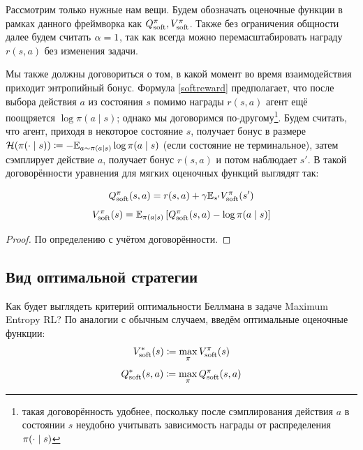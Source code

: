 Рассмотрим только нужные нам вещи. Будем обозначать оценочные функции в рамках данного фреймворка как $Q^\pi_{\mathrm{soft}}, V^\pi_{\mathrm{soft}}$. Также без ограничения общности далее будем считать $\alpha \HM= 1$, так как всегда можно перемасштабировать награду $r(s, a)$ без изменения задачи.

Мы также должны договориться о том, в какой момент во время взаимодействия приходит энтропийный бонус. Формула \eqref{softreward} предполагает, что после выбора действия $a$ из состояния $s$ помимо награды $r(s, a)$ агент ещё поощряется $\log \pi(a \mid s)$; однако мы договоримся по-другому\footnote{такая договорённость удобнее, поскольку после сэмплирования действия $a$ в состоянии $s$ неудобно учитывать зависимость награды от распределения $\pi(\cdot \HM\mid s)$}. Будем считать, что агент, приходя в некоторое состояние $s$, получает бонус в размере $\mathcal{H}(\pi(\cdot \mid s)) \HM\coloneqq - \E_{a \sim \pi(a \mid s)} \log \pi(a \mid s)$ (если состояние не терминальное), затем сэмплирует действие $a$, получает бонус $r(s, a)$ и потом наблюдает $s'$. В такой договорённости уравнения для мягких оценочных функций выглядят так:

\begin{theorem}
$$Q^\pi_{\mathrm{soft}}(s, a) = r(s, a) + \gamma \mathbb{E}_{s'} V^\pi_{\mathrm{soft}}(s')$$
\begin{equation}\label{softVQ}
V^\pi_{\mathrm{soft}}(s) = \mathbb{E}_{\pi(a \mid s)} \left[ Q^\pi_{\mathrm{soft}}(s, a) - \log \pi(a \mid s) \right]
\end{equation}
\begin{proof}
По определению с учётом договорённости.
\end{proof}
\end{theorem}

\subsection{Вид оптимальной стратегии}

Как будет выглядеть критерий оптимальности Беллмана в задаче Maximum Entropy RL? По аналогии с обычным случаем, введём оптимальные оценочные функции:
$$V^*_{\mathrm{soft}}(s) \coloneqq \max_{\pi} V^{\pi}_{\mathrm{soft}}(s)$$
$$Q^*_{\mathrm{soft}}(s, a) \coloneqq \max_{\pi} Q^{\pi}_{\mathrm{soft}}(s, a)$$

